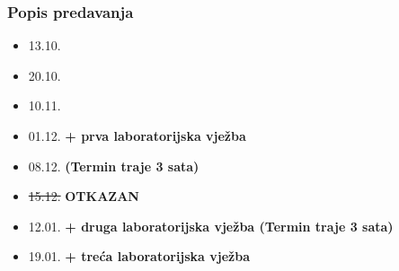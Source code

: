 \documentclass{beamer}
\begin{document}
	\begin{frame}[t]
	\frametitle{Popis predavanja}
	\begin{itemize}
		\item 13.10.
		\item 20.10.
		\item 10.11.
		\item 01.12. \textbf{+ prva laboratorijska vježba}
		\item 08.12. \textbf{(Termin traje 3 sata)}
		\item \sout{15.12.} \textbf{OTKAZAN}
		\item 12.01. \textbf{+ druga laboratorijska vježba (Termin traje 3 sata)}
		\item 19.01. \textbf{+ treća laboratorijska vježba}
	\end{itemize}
	\end{frame}
\end{document}
